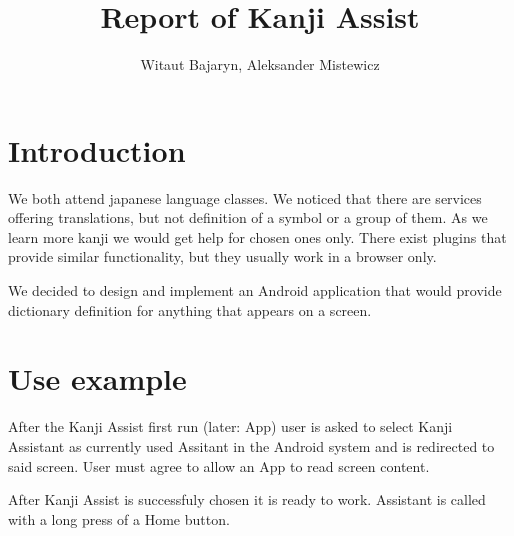 \documentclass[11pt,a4paper]{article}
\title{Report of Kanji Assist}
\author{Witaut Bajaryn, Aleksander Mistewicz}
\begin{document}
\maketitle
\newpage

\section{Introduction}

We both attend japanese language classes. We noticed that there are services
offering translations, but not definition of a symbol or a group of them.
As we learn more kanji we would get help for chosen ones only.
There exist plugins that provide similar functionality, but they usually
work in a browser only.

We decided to design and implement an Android application that would
provide dictionary definition for anything that appears on a screen.

\section{Use example}

After the Kanji Assist first run (later: App) user is asked to select Kanji
Assistant as currently used Assitant in the Android system and is redirected
to said screen. User must agree to allow an App to read screen content.

After Kanji Assist is successfuly chosen it is ready to work. Assistant
is called with a long press of a Home button.
\end{document}
